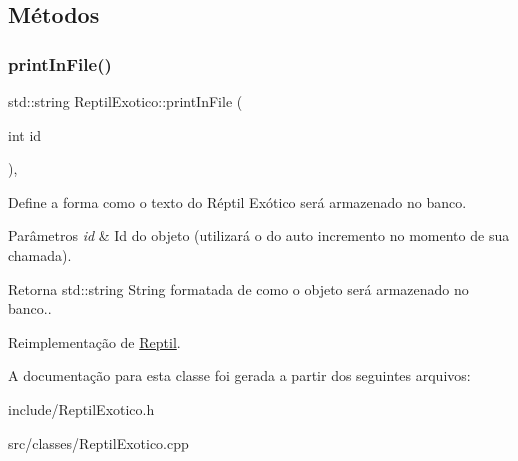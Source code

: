 \subsection{Métodos}
\mbox{\label{classReptilExotico_a71312f425b92e04d8f29a856abd83f26}} 
\subsubsection{\texorpdfstring{print\+In\+File()}{printInFile()}}
{\footnotesize\ttfamily std\+::string Reptil\+Exotico\+::print\+In\+File (\begin{DoxyParamCaption}\item[{int}]{id }\end{DoxyParamCaption})\hspace{0.3cm}{\ttfamily [protected]}, {\ttfamily [virtual]}}



Define a forma como o texto do Réptil Exótico será armazenado no banco. 


\begin{DoxyParams}{Parâmetros}
{\em id} & Id do objeto (utilizará o do auto incremento no momento de sua chamada). \\
\hline
\end{DoxyParams}
\begin{DoxyReturn}{Retorna}
std\+::string String formatada de como o objeto será armazenado no banco.. 
\end{DoxyReturn}


Reimplementação de \hyperlink{classReptil_af0fc1ff345f15480da9830e38111d181}{Reptil}.



A documentação para esta classe foi gerada a partir dos seguintes arquivos\+:\begin{DoxyCompactItemize}
\item 
include/Reptil\+Exotico.\+h\item 
src/classes/Reptil\+Exotico.\+cpp\end{DoxyCompactItemize}
